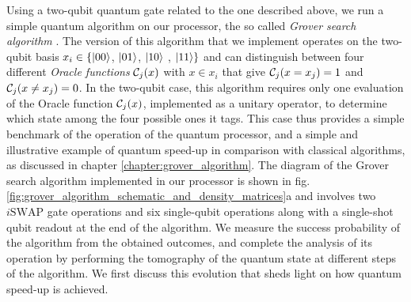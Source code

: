 Using a two-qubit quantum gate related to the one
described above, we run a simple quantum algorithm on our processor,
the so called \textit{Grover search algorithm} \citep{Grover_Quantum_1997}.
The version of this algorithm that we implement operates on the
two-qubit basis $x_{i}\in\{\left| 00 \right>$, $\left| 01 \right>$, $\left| 10 \right>$
, $\left| 11 \right>\}$ and can distinguish between four different \textit{Oracle
functions} $\Or_{j}(x)$ with $x\in x_{i}$ that give $\Or_j(x=x_j)=1$ and $\Or_j(x \ne x_j)=0$. In the two-qubit case, this algorithm requires only
one evaluation of the Oracle function $\Or_j(x)$, implemented as a unitary operator,
to determine which state among the four possible ones it tags. This
case thus provides a simple benchmark of the operation of the quantum
processor, and a simple and illustrative example of quantum speed-up
in comparison with classical algorithms, as discussed
in chapter \ref{chapter:grover_algorithm}. The diagram of the Grover search algorithm implemented
in our processor is shown in fig. \ref{fig:grover_algorithm_schematic_and_density_matrices}a
and involves two $i\mathrm{SWAP}$ gate operations and six single-qubit
operations along with a single-shot qubit readout at the end of the
algorithm. We measure the success probability of the algorithm from
the obtained outcomes, and complete the analysis of its operation
by performing the tomography of the quantum state at different steps
of the algorithm. We first discuss this evolution that sheds light
on how quantum speed-up is achieved.

